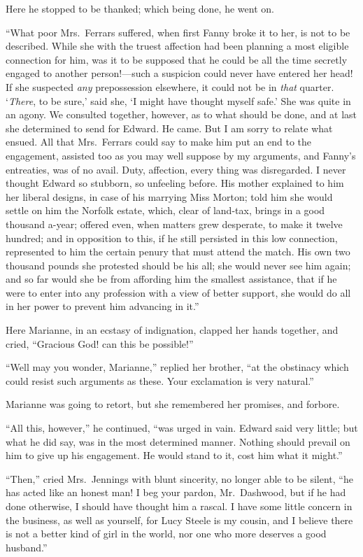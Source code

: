 Here he stopped to be thanked; which being done,
he went on.

``What poor Mrs.\ Ferrars suffered, when first Fanny
broke it to her, is not to be described.  While she with
the truest affection had been planning a most eligible
connection for him, was it to be supposed that he could
be all the time secretly engaged to another person!---such
a suspicion could never have entered her head!  If she
suspected \emph{any} prepossession elsewhere, it could not be
in \emph{that} quarter.  `\emph{There}, to be sure,' said she, `I might
have thought myself safe.' She was quite in an agony.
We consulted together, however, as to what should be done,
and at last she determined to send for Edward.
He came.  But I am sorry to relate what ensued.
All that Mrs.\ Ferrars could say to make him put an end
to the engagement, assisted too as you may well suppose
by my arguments, and Fanny's entreaties, was of
no avail.  Duty, affection, every thing was disregarded.
I never thought Edward so stubborn, so unfeeling before.
His mother explained to him her liberal designs, in case
of his marrying Miss Morton; told him she would settle on
him the Norfolk estate, which, clear of land-tax, brings
in a good thousand a-year; offered even, when matters
grew desperate, to make it twelve hundred; and in opposition
to this, if he still persisted in this low connection,
represented to him the certain penury that must attend
the match.  His own two thousand pounds she protested
should be his all; she would never see him again; and so far
would she be from affording him the smallest assistance,
that if he were to enter into any profession with a view
of better support, she would do all in her power to prevent
him advancing in it.''

Here Marianne, in an ecstasy of indignation,
clapped her hands together, and cried, ``Gracious God!
can this be possible!''

``Well may you wonder, Marianne,'' replied her brother,
``at the obstinacy which could resist such arguments as these.
Your exclamation is very natural.''

Marianne was going to retort, but she remembered
her promises, and forbore.

``All this, however,'' he continued, ``was urged in vain.
Edward said very little; but what he did say, was in
the most determined manner.  Nothing should prevail on
him to give up his engagement.  He would stand to it,
cost him what it might.''

``Then,'' cried Mrs.\ Jennings with blunt sincerity,
no longer able to be silent, ``he has acted like an honest
man! I beg your pardon, Mr.\ Dashwood, but if he had
done otherwise, I should have thought him a rascal.
I have some little concern in the business, as well
as yourself, for Lucy Steele is my cousin, and I believe
there is not a better kind of girl in the world, nor one
who more deserves a good husband.''

